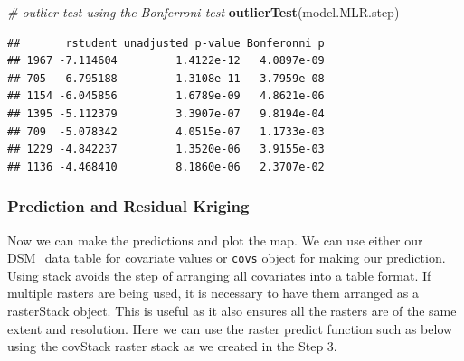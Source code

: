 \documentclass[10pt,b5paper,]{book}
\newenvironment{Shaded}{\begin{snugshade}}{\end{snugshade}}
\newcommand{\CommentTok}[1]{\textcolor[rgb]{0.56,0.35,0.01}{\textit{#1}}}
\newcommand{\DataTypeTok}[1]{\textcolor[rgb]{0.13,0.29,0.53}{#1}}
\newcommand{\KeywordTok}[1]{\textcolor[rgb]{0.13,0.29,0.53}{\textbf{#1}}}
\newcommand{\NormalTok}[1]{#1}
\newcommand{\OperatorTok}[1]{\textcolor[rgb]{0.81,0.36,0.00}{\textbf{#1}}}
\newcommand{\StringTok}[1]{\textcolor[rgb]{0.31,0.60,0.02}{#1}}
\theoremstyle{definition}
\theoremstyle{definition}
\theoremstyle{definition}
\theoremstyle{remark}
\begin{document}
\begin{Shaded}
\begin{Highlighting}[]
\CommentTok{# outlier test using the Bonferroni test}
\KeywordTok{outlierTest}\NormalTok{(model.MLR.step)}
\end{Highlighting}
\end{Shaded}

\begin{verbatim}
##       rstudent unadjusted p-value Bonferonni p
## 1967 -7.114604         1.4122e-12   4.0897e-09
## 705  -6.795188         1.3108e-11   3.7959e-08
## 1154 -6.045856         1.6789e-09   4.8621e-06
## 1395 -5.112379         3.3907e-07   9.8194e-04
## 709  -5.078342         4.0515e-07   1.1733e-03
## 1229 -4.842237         1.3520e-06   3.9155e-03
## 1136 -4.468410         8.1860e-06   2.3707e-02
\end{verbatim}

\hypertarget{prediction-and-residual-kriging}{%
\subsubsection{Prediction and Residual
Kriging}\label{prediction-and-residual-kriging}}

Now we can make the predictions and plot the map. We can use either our
DSM\_data table for covariate values or \texttt{covs} object for making
our prediction. Using stack avoids the step of arranging all covariates
into a table format. If multiple rasters are being used, it is necessary
to have them arranged as a rasterStack object. This is useful as it also
ensures all the rasters are of the same extent and resolution. Here we
can use the raster predict function such as below using the covStack
raster stack as we created in the Step 3.

\begin{Shaded}
\end{Shaded}
\end{document}
